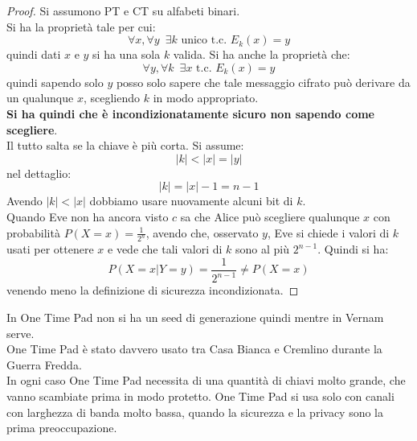 \documentclass[a4paper,12pt, oneside]{book}
\begin{document}
\begin{proof}
  Si assumono PT e CT su alfabeti binari.\\
  Si ha la proprietà tale per cui:
  \[\forall x, \forall y\,\,\, \exists k \mbox{ unico t.c. } E_k(x)=y\]
  quindi dati $x$ e $y$ si ha una sola $k$ valida.
  Si ha anche la proprietà che:
  \[\forall y, \forall k\,\,\, \exists x \mbox{ t.c. } E_k(x)=y\]
  quindi sapendo solo $y$ posso solo sapere che tale messaggio cifrato può
  derivare da un qualunque $x$, scegliendo $k$ in modo appropriato.\\
  \textbf{Si ha quindi che è incondizionatamente sicuro non sapendo come
    scegliere}.\\ 
  Il tutto salta se la chiave è più corta. Si assume:
  \[|k|<|x|=|y|\]
  nel dettaglio:
  \[|k|=|x|-1=n-1\]
  Avendo $|k|<|x|$ dobbiamo usare nuovamente alcuni bit di $k$.\\
  Quando Eve non ha ancora visto $c$ sa che Alice può scegliere qualunque $x$
  con probabilità $P(X=x)=\frac{1}{2^n}$, avendo che, osservato $y$, Eve si
  chiede i valori di $k$ usati per ottenere $x$ e vede che tali valori di $k$
  sono al più $2^{n-1}$. Quindi si ha:
  \[P(X=x|Y=y)=\frac{1}{2^{n-1}}\neq P(X=x)\]
  venendo meno la definizione di sicurezza incondizionata.
\end{proof}

In One Time Pad non si ha un seed di generazione quindi mentre in Vernam
serve.\\
One Time Pad è stato davvero usato tra Casa Bianca e Cremlino durante la Guerra
Fredda.\\
In ogni caso One Time Pad necessita di una quantità di chiavi molto grande, che
vanno scambiate prima in modo protetto. One Time Pad si usa solo con canali con
larghezza di banda molto bassa, quando la sicurezza e la privacy sono la prima
preoccupazione.
\end{document}
